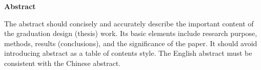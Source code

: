 \clearpage
{}
{}

\begin{center}
  \linespread{1.5}\selectfont
  {\timesnewroman\bfseries\fontsize{15pt}{18pt}\selectfont \zjutitlee \par}
  \vspace{1em}
  {\timesnewroman\bfseries\fontsize{15pt}{18pt}\selectfont Abstract \par}
\end{center}

\linespread{1.5}\selectfont
\timesnewroman\fontsize{12pt}{14.4pt}\selectfont

The abstract should concisely and accurately describe the important content of the graduation design (thesis) work. Its basic elements include research purpose, methods, results (conclusions), and the significance of the paper. It should avoid introducing abstract as a table of contents style. The English abstract must be consistent with the Chinese abstract.

\vspace{2em}


